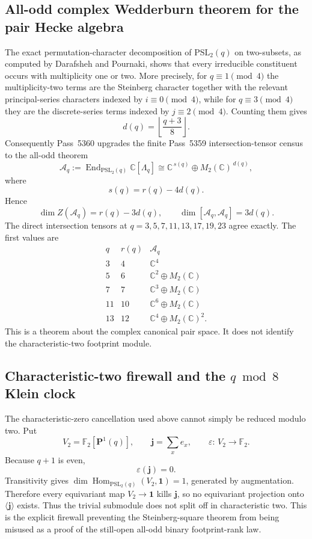 \subsection{All-odd complex Wedderburn theorem for the pair Hecke algebra}
\label{sec:pass5360-pair-wedderburn}

The exact permutation-character decomposition of $\mathrm{PSL}_2(q)$ on two-subsets,
as computed by Darafsheh and Pournaki, shows that every irreducible constituent
occurs with multiplicity one or two.  More precisely, for $q\equiv1\pmod4$ the
multiplicity-two terms are the Steinberg character together with the relevant
principal-series characters indexed by $i\equiv0\pmod4$, while for
$q\equiv3\pmod4$ they are the discrete-series terms indexed by
$j\equiv2\pmod4$.  Counting them gives
\[
 d(q)=\left\lfloor\frac{q+3}{8}\right\rfloor.
\]
Consequently Pass~5360 upgrades the finite Pass~5359 intersection-tensor
census to the all-odd theorem
\[
 \boxed{
 \mathcal A_q:=\operatorname{End}_{\mathrm{PSL}_2(q)}\mathbb C[\Lambda_q]
 \cong
 \mathbb C^{\,s(q)}\oplus M_2(\mathbb C)^{\,d(q)},
 }
\]
where
\[
 s(q)=r(q)-4d(q).
\]
Hence
\[
 \boxed{
 \dim Z(\mathcal A_q)=r(q)-3d(q),
 \qquad
 \dim[\mathcal A_q,\mathcal A_q]=3d(q).
 }
\]
The direct intersection tensors at
$q=3,5,7,11,13,17,19,23$ agree exactly.  The first values are
\[
 \begin{array}{c|c|c}
 q&r(q)&\mathcal A_q\\\hline
 3&4&\mathbb C^4\\
 5&6&\mathbb C^2\oplus M_2(\mathbb C)\\
 7&7&\mathbb C^3\oplus M_2(\mathbb C)\\
 11&10&\mathbb C^6\oplus M_2(\mathbb C)\\
 13&12&\mathbb C^4\oplus M_2(\mathbb C)^2.
 \end{array}
\]
This is a theorem about the complex canonical pair space.  It does not identify
the characteristic-two footprint module.

\subsection{Characteristic-two firewall and the $q\bmod8$ Klein clock}
\label{sec:pass5361-qmod8-clock}

The characteristic-zero cancellation used above cannot simply be reduced
modulo two.  Put
\[
 V_2=\mathbb F_2[\mathbf P^1(q)],
 \qquad
 \mathbf j=\sum_x e_x,
 \qquad
 \varepsilon\!:\,V_2\to\mathbb F_2.
\]
Because $q+1$ is even,
\[
 \varepsilon(\mathbf j)=0.
\]
Transitivity gives
$\dim\operatorname{Hom}_{\mathrm{PSL}_2(q)}(V_2,\mathbf1)=1$, generated by
augmentation.  Therefore every equivariant map $V_2\to\mathbf1$ kills
$\mathbf j$, so no equivariant projection onto $\langle\mathbf j\rangle$
exists.  Thus the trivial submodule does not split off in characteristic two.
This is the explicit firewall preventing the Steinberg-square theorem from
being misused as a proof of the still-open all-odd binary footprint-rank law.

